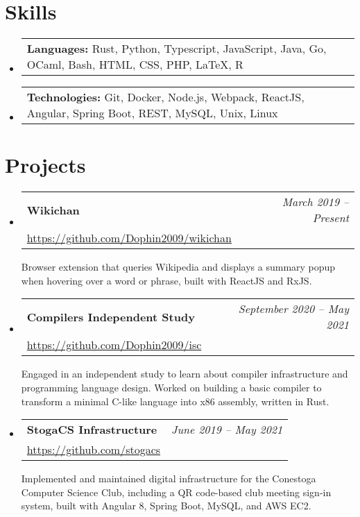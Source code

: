 \documentclass[letterpaper,11pt]{article}
\makeatletter
\newcommand{\resumeSubheading}[4]{
  \vspace{-2pt}\item
    \begin{tabular*}{0.97\textwidth}[t]{l@{\extracolsep{\fill}}r}
      \textbf{#1} & #2 \\
      {#3} & \textit{\small #4} \\[3pt]
    \end{tabular*}\vspace{-5pt}
}
\newcommand{\resumeSubheadingDescription}[1]{
  \parbox{0.97\textwidth}{#1}
}
\newcommand{\resumeSubSubSubheading}[2]{
  \vspace{3pt}
  \item \begin{tabular*}{0.97\textwidth}{l}
      \textbf{#1:} #2 \\
    \end{tabular*}\vspace{-8pt}
}
\newenvironment{resumeSubHeadingList}{
  \begin{itemize}[leftmargin=*, label={}]
}{
  \end{itemize}
}
\makeatother
\begin{document}
\section{Skills}
  \vspace*{-5pt}

  \begin{resumeSubHeadingList}
    \resumeSubSubSubheading{Languages}%
      {Rust, Python, Typescript, JavaScript, Java, Go, OCaml, Bash, HTML, CSS, PHP, LaTeX, R}
    \resumeSubSubSubheading{Technologies}%
      {Git, Docker, Node.js, Webpack, ReactJS, Angular, Spring Boot, REST, MySQL, Unix, Linux}
  \end{resumeSubHeadingList}

  \vspace*{0pt}

\vspace*{-2pt}
\section{Projects}

  \begin{resumeSubHeadingList}
    \resumeSubheading%
      {Wikichan}%
      {\small\itshape March 2019 -- Present}%
      {\small \url{https://github.com/Dophin2009/wikichan}}%
      {}

      \resumeSubheadingDescription{
        Browser extension that queries Wikipedia and displays a summary popup when hovering over a
        word or phrase, built with ReactJS and RxJS.
      }

    \resumeSubheading%
      {Compilers Independent Study}%
      {\small\itshape September 2020 -- May 2021}%
      {\small \url{https://github.com/Dophin2009/isc}}%
      {}

      \resumeSubheadingDescription{
        Engaged in an independent study to learn about compiler infrastructure and programming
        language design. Worked on building a basic compiler to transform a minimal C-like language
        into x86 assembly, written in Rust.
      }

    \resumeSubheading%
      {StogaCS Infrastructure}%
      {\small\itshape June 2019 -- May 2021}%
      {\small \url{https://github.com/stogacs}}%
      {}

      \resumeSubheadingDescription{
        Implemented and maintained digital infrastructure for the Conestoga Computer Science Club,
        including a QR code-based club meeting sign-in system, built with Angular 8, Spring Boot,
        MySQL, and AWS EC2.
      }
  \end{resumeSubHeadingList}
\end{document}
